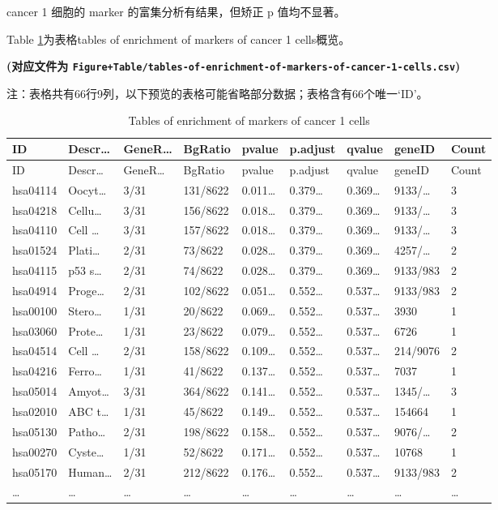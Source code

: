 \documentclass[
]{article}
\begin{document}
cancer 1 细胞的 marker 的富集分析有结果，但矫正 p 值均不显著。

Table \ref{tab:tables-of-enrichment-of-markers-of-cancer-1-cells}为表格tables of enrichment of markers of cancer 1 cells概览。

\textbf{(对应文件为 \texttt{Figure+Table/tables-of-enrichment-of-markers-of-cancer-1-cells.csv})}

\begin{center}\begin{tcolorbox}[colback=gray!10, colframe=gray!50, width=0.9\linewidth, arc=1mm, boxrule=0.5pt]注：表格共有66行9列，以下预览的表格可能省略部分数据；表格含有66个唯一`ID'。
\end{tcolorbox}
\end{center}

\begin{longtable}[]{@{}lllllllll@{}}
\caption{\label{tab:tables-of-enrichment-of-markers-of-cancer-1-cells}Tables of enrichment of markers of cancer 1 cells}\tabularnewline
\toprule
ID & Descr\ldots{} & GeneR\ldots{} & BgRatio & pvalue & p.adjust & qvalue & geneID & Count\tabularnewline
\midrule
\endfirsthead
\toprule
ID & Descr\ldots{} & GeneR\ldots{} & BgRatio & pvalue & p.adjust & qvalue & geneID & Count\tabularnewline
\midrule
\endhead
hsa04114 & Oocyt\ldots{} & 3/31 & 131/8622 & 0.011\ldots{} & 0.379\ldots{} & 0.369\ldots{} & 9133/\ldots{} & 3\tabularnewline
hsa04218 & Cellu\ldots{} & 3/31 & 156/8622 & 0.018\ldots{} & 0.379\ldots{} & 0.369\ldots{} & 9133/\ldots{} & 3\tabularnewline
hsa04110 & Cell \ldots{} & 3/31 & 157/8622 & 0.018\ldots{} & 0.379\ldots{} & 0.369\ldots{} & 9133/\ldots{} & 3\tabularnewline
hsa01524 & Plati\ldots{} & 2/31 & 73/8622 & 0.028\ldots{} & 0.379\ldots{} & 0.369\ldots{} & 4257/\ldots{} & 2\tabularnewline
hsa04115 & p53 s\ldots{} & 2/31 & 74/8622 & 0.028\ldots{} & 0.379\ldots{} & 0.369\ldots{} & 9133/983 & 2\tabularnewline
hsa04914 & Proge\ldots{} & 2/31 & 102/8622 & 0.051\ldots{} & 0.552\ldots{} & 0.537\ldots{} & 9133/983 & 2\tabularnewline
hsa00100 & Stero\ldots{} & 1/31 & 20/8622 & 0.069\ldots{} & 0.552\ldots{} & 0.537\ldots{} & 3930 & 1\tabularnewline
hsa03060 & Prote\ldots{} & 1/31 & 23/8622 & 0.079\ldots{} & 0.552\ldots{} & 0.537\ldots{} & 6726 & 1\tabularnewline
hsa04514 & Cell \ldots{} & 2/31 & 158/8622 & 0.109\ldots{} & 0.552\ldots{} & 0.537\ldots{} & 214/9076 & 2\tabularnewline
hsa04216 & Ferro\ldots{} & 1/31 & 41/8622 & 0.137\ldots{} & 0.552\ldots{} & 0.537\ldots{} & 7037 & 1\tabularnewline
hsa05014 & Amyot\ldots{} & 3/31 & 364/8622 & 0.141\ldots{} & 0.552\ldots{} & 0.537\ldots{} & 1345/\ldots{} & 3\tabularnewline
hsa02010 & ABC t\ldots{} & 1/31 & 45/8622 & 0.149\ldots{} & 0.552\ldots{} & 0.537\ldots{} & 154664 & 1\tabularnewline
hsa05130 & Patho\ldots{} & 2/31 & 198/8622 & 0.158\ldots{} & 0.552\ldots{} & 0.537\ldots{} & 9076/\ldots{} & 2\tabularnewline
hsa00270 & Cyste\ldots{} & 1/31 & 52/8622 & 0.171\ldots{} & 0.552\ldots{} & 0.537\ldots{} & 10768 & 1\tabularnewline
hsa05170 & Human\ldots{} & 2/31 & 212/8622 & 0.176\ldots{} & 0.552\ldots{} & 0.537\ldots{} & 9133/983 & 2\tabularnewline
\ldots{} & \ldots{} & \ldots{} & \ldots{} & \ldots{} & \ldots{} & \ldots{} & \ldots{} & \ldots{}\tabularnewline
\bottomrule
\end{longtable}
\end{document}
